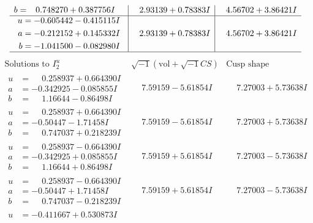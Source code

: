 \documentclass[1p]{elsarticle_modified}
\theoremstyle{definition}
\newcommand{\I}{\sqrt{-1}}
\begin{document}
$$\begin{array}{c|c|c}
\begin{aligned}
b &= \phantom{-}0.748270 + 0.387756 I\end{aligned}
 & \phantom{-}2.93139 + 0.78383 I & \phantom{-}4.56702 + 3.86421 I \\ \hline\begin{aligned}
u &= -0.605442 - 0.415115 I \\
a &= -0.212152 + 0.145332 I \\
b &= -1.041500 - 0.082980 I\end{aligned}
 & \phantom{-}2.93139 + 0.78383 I & \phantom{-}4.56702 + 3.86421 I\\
 \hline 
 \end{array}$$\newpage$$\begin{array}{c|c|c}  
\text{Solutions to }I^u_{2}& \I (\text{vol} + \sqrt{-1}CS) & \text{Cusp shape}\\
 \hline 
\begin{aligned}
u &= \phantom{-}0.258937 + 0.664390 I \\
a &= -0.342925 - 0.085855 I \\
b &= \phantom{-}1.16644 - 0.86498 I\end{aligned}
 & \phantom{-}7.59159 - 5.61854 I & \phantom{-}7.27003 + 5.73638 I \\ \hline\begin{aligned}
u &= \phantom{-}0.258937 + 0.664390 I \\
a &= -0.50447 - 1.71458 I \\
b &= \phantom{-}0.747037 + 0.218239 I\end{aligned}
 & \phantom{-}7.59159 - 5.61854 I & \phantom{-}7.27003 + 5.73638 I \\ \hline\begin{aligned}
u &= \phantom{-}0.258937 - 0.664390 I \\
a &= -0.342925 + 0.085855 I \\
b &= \phantom{-}1.16644 + 0.86498 I\end{aligned}
 & \phantom{-}7.59159 + 5.61854 I & \phantom{-}7.27003 - 5.73638 I \\ \hline\begin{aligned}
u &= \phantom{-}0.258937 - 0.664390 I \\
a &= -0.50447 + 1.71458 I \\
b &= \phantom{-}0.747037 - 0.218239 I\end{aligned}
 & \phantom{-}7.59159 + 5.61854 I & \phantom{-}7.27003 - 5.73638 I \\ \hline\begin{aligned}
u &= -0.411667 + 0.530873 I \\

\end{aligned}
\end{array}$$
\end{document}
